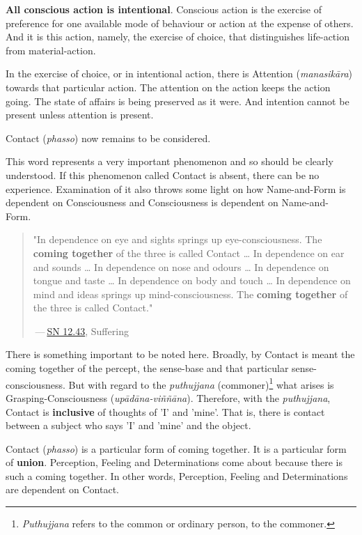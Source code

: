 \textbf{All conscious action is intentional}. Conscious action is the exercise of preference for one available mode of behaviour or action at the expense of others. And it is this action, namely, the exercise of choice, that distinguishes life-action from material-action.

In the exercise of choice, or in intentional action, there is Attention (\emph{manasikāra}) towards that particular action. The attention on the action keeps the action going. The state of affairs is being preserved as it were. And intention cannot be present unless attention is present.

Contact (\emph{phasso}) now remains to be considered.

This word represents a very important phenomenon and so should be clearly understood. If this phenomenon called Contact is absent, there can be no experience. Examination of it also throws some light on how Name-and-Form is dependent on Consciousness and Consciousness is dependent on Name-and- Form.

\begin{quote}
"In dependence on eye and sights springs up eye-consciousness. The \textbf{coming together} of the three is called Contact \ldots{} In dependence on ear and sounds \ldots{} In dependence on nose and odours \ldots{} In dependence on tongue and taste \ldots{} In dependence on body and touch \ldots{} In dependence on mind and ideas springs up mind-consciousness. The \textbf{coming together} of the three is called Contact."

 --- \href{https://suttacentral.net/sn12.43/en/bodhi}{SN 12.43}, Suffering
\end{quote}

There is something important to be noted here. Broadly, by Contact is meant the coming together of the percept, the sense-base and that particular sense-consciousness. But with regard to the \emph{puthujjana} (commoner)\footnote{\emph{Puthujjana} refers to the common or ordinary person, to the commoner.} what arises is Grasping-Consciousness (\emph{upādāna-viññāna}). Therefore, with the \emph{puthujjana}, Contact is \textbf{inclusive} of thoughts of 'I' and 'mine'. That is, there is contact between a subject who says 'I' and 'mine' and the object.

Contact (\emph{phasso}) is a particular form of coming together. It is a particular form of \textbf{union}. Perception, Feeling and Determinations come about because there is such a coming together. In other words, Perception, Feeling and Determinations are dependent on Contact.

